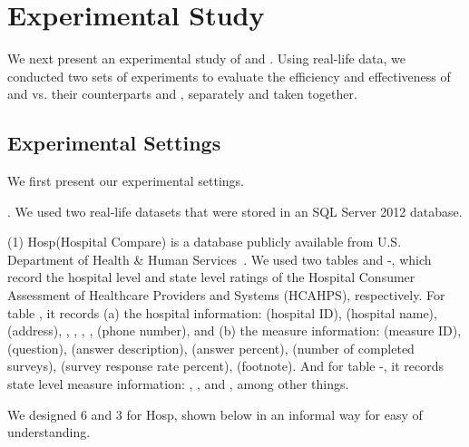 \newcommand{\dblp}{{\sc Dblp}\xspace}
\newcommand{\hosp}{{\sc Hosp}\xspace}
\newcommand{\hcahps}{{\sc hcahps}\xspace}



\section{Experimental Study}
\label{sec-exp}

We next present an experimental study of \pCFDs and \pCINDs. Using real-life data, we conducted two sets of experiments to evaluate the efficiency and effectiveness of \pCFDs and \pCINDs vs. their counterparts \CFDs and \CINDs, separately and taken together.

\subsection{Experimental Settings}
We first present our experimental settings.

. We used two real-life datasets that were stored in an SQL Server 2012 database.

\ni(1) \hosp (Hospital Compare) is a database publicly available from U.S. Department of Health %
\& Human Services~\cite{hosp}. We used two tables  and -, which record the hospital level and state level ratings of the Hospital Consumer Assessment of Healthcare Providers and Systems (HCAHPS), respectively.
%
For table , it records (a) the hospital information:  (hospital ID),  (hospital name),  (address), , , , ,  (phone number), and (b) the measure information:  (measure ID),  (question),  (answer description),  (answer percent),  (number of completed surveys),  (survey response rate percent),  (footnote).
%
And for table -, it records state level measure information: , ,  and , among other things. 


We designed 6 \pCFDs and 3 \pCINDs for \hosp, shown below in an informal way for easy of understanding. 

